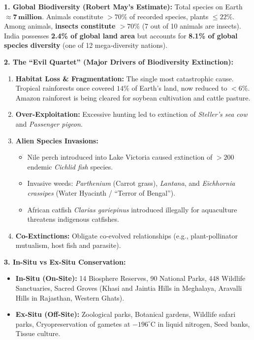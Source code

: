 \documentclass[10pt,twoside,openright]{book}
\begin{document}
\begin{ncertbox}
\textbf{1. Global Biodiversity (Robert May's Estimate):}
Total species on Earth $\approx \mathbf{7\,\text{million}}$. Animals constitute $>70\%$ of recorded species, plants $\le 22\%$. Among animals, \textbf{insects constitute $>70\%$} (7 out of 10 animals are insects). India possesses \textbf{2.4\% of global land area} but accounts for \textbf{8.1\% of global species diversity} (one of 12 mega-diversity nations).

\textbf{2. The ``Evil Quartet'' (Major Drivers of Biodiversity Extinction):}
\begin{enumerate}
  \item \textbf{Habitat Loss \& Fragmentation:} The single most catastrophic cause. Tropical rainforests once covered $14\%$ of Earth's land, now reduced to $<6\%$. Amazon rainforest is being cleared for soybean cultivation and cattle pasture.
  \item \textbf{Over-Exploitation:} Excessive hunting led to extinction of \textit{Steller's sea cow} and \textit{Passenger pigeon}.
  \item \textbf{Alien Species Invasions:}
  \begin{itemize}
    \item Nile perch introduced into Lake Victoria caused extinction of $>200$ endemic \textit{Cichlid fish} species.
    \item Invasive weeds: \textit{Parthenium} (Carrot grass), \textit{Lantana}, and \textit{Eichhornia crassipes} (Water Hyacinth / ``Terror of Bengal'').
    \item African catfish \textit{Clarias gariepinus} introduced illegally for aquaculture threatens indigenous catfishes.
  \end{itemize}
  \item \textbf{Co-Extinctions:} Obligate co-evolved relationships (e.g., plant-pollinator mutualism, host fish and parasite).
\end{enumerate}

\textbf{3. In-Situ vs Ex-Situ Conservation:}
\begin{itemize}
  \item \textbf{In-Situ (On-Site):} 14 Biosphere Reserves, 90 National Parks, 448 Wildlife Sanctuaries, Sacred Groves (Khasi and Jaintia Hills in Meghalaya, Aravalli Hills in Rajasthan, Western Ghats).
  \item \textbf{Ex-Situ (Off-Site):} Zoological parks, Botanical gardens, Wildlife safari parks, Cryopreservation of gametes at $-196^\circ\mathrm{C}$ in liquid nitrogen, Seed banks, Tissue culture.
\end{itemize}
\end{ncertbox}
\end{document}
